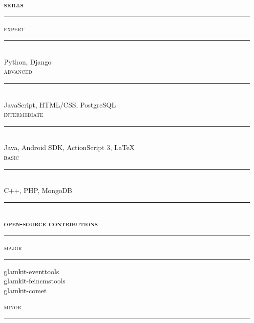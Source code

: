\documentclass[a4paper,12pt]{letter}
\begin{document}
\begin{minipage}[t]{95mm}
	{\Large{\textsc{\textbf{skills}}}}\\
	\vspace{1mm}%
	\rule[1mm]{\linewidth}{1mm}
	
	{\large\textsc{expert}}\\
	\vspace{-2mm}%
	\rule[3mm]{\linewidth}{0.25mm}\\
	{\LARGE Python, Django}
	\\
	
	{\large\textsc{advanced}}\\
	\vspace{-2.1mm}%
	\rule[3mm]{\linewidth}{0.25mm}\\
	{\Large JavaScript, HTML/CSS, PostgreSQL}
	\\
	
	{\large\textsc{intermediate}}\\
	\vspace{-2.6mm}%
	\rule[3mm]{\linewidth}{0.25mm}\\	
	{\large Java, Android SDK, ActionScript 3, \LaTeX{}}
	\\
	
	{\large\textsc{basic}}\\
	\vspace{-3.1mm}%
	\rule[3mm]{\linewidth}{0.25mm}\\
	{\normalsize C++, PHP, MongoDB}
	
	\vspace{3mm}
	\rule[1mm]{\linewidth}{1mm}\\
	{\Large\textsc{\textbf{open-source contributions}}}\\
	\vspace{1mm}%
	\rule[1mm]{\linewidth}{1mm}
	
	\begin{minipage}[t]{44.5mm}
		{\large\textsc{major}}\\
		\vspace{-3.1mm}%
		\rule[3mm]{\linewidth}{0.25mm}
				
		{\normalsize
		glamkit-eventtools\\
		glamkit-feincmstools\\
		glamkit-comet}
	\end{minipage}%
	\hspace{5mm}
	\begin{minipage}[t]{44.5mm}
		{\large\textsc{minor}}\\
		\vspace{-3.1mm}%
		\rule[3mm]{\linewidth}{0.25mm}
		

\end{minipage}
\end{minipage}
\end{document}
